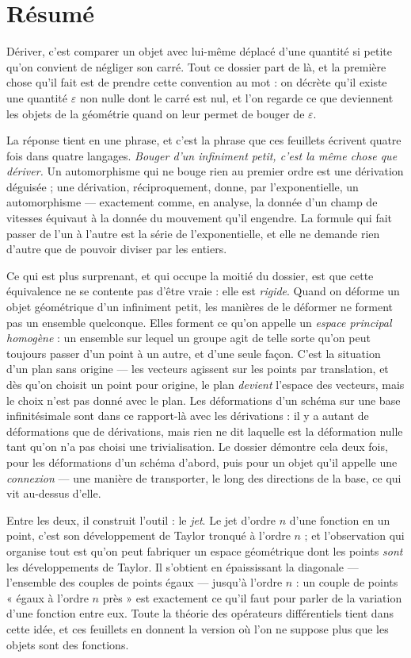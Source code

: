 \documentclass[11pt,a4paper]{article}
\begin{document}
\section*{Résumé}

\begin{resume}
Dériver, c'est comparer un objet avec lui-même déplacé d'une quantité si petite
qu'on convient de négliger son carré. Tout ce dossier part de là, et la première
chose qu'il fait est de prendre cette convention au mot : on décrète qu'il
existe une quantité $\varepsilon$ non nulle dont le carré est nul, et l'on
regarde ce que deviennent les objets de la géométrie quand on leur permet de
bouger de $\varepsilon$.

La réponse tient en une phrase, et c'est la phrase que ces feuillets écrivent
quatre fois dans quatre langages. \emph{Bouger d'un infiniment petit, c'est la
même chose que dériver.} Un automorphisme qui ne bouge rien au premier ordre
est une dérivation déguisée ; une dérivation, réciproquement, donne, par l'exponentielle, un automorphisme — exactement comme, en analyse, la donnée d'un champ de vitesses
équivaut à la donnée du mouvement qu'il engendre. La formule qui fait passer de
l'un à l'autre est la série de l'exponentielle, et elle ne demande rien d'autre
que de pouvoir diviser par les entiers.

Ce qui est plus surprenant, et qui occupe la moitié du dossier, est que cette
équivalence ne se contente pas d'être vraie : elle est \emph{rigide}. Quand on
déforme un objet géométrique d'un infiniment petit, les manières de le déformer
ne forment pas un ensemble quelconque. Elles forment ce qu'on appelle un
\emph{espace principal homogène} : un ensemble sur lequel un groupe agit de
telle sorte qu'on peut toujours passer d'un point à un autre, et d'une seule
façon. C'est la situation d'un plan sans origine — les vecteurs agissent sur les
points par translation, et dès qu'on choisit un point pour origine, le plan
\emph{devient} l'espace des vecteurs, mais le choix n'est pas donné avec le
plan. Les déformations d'un schéma sur une base infinitésimale sont dans ce
rapport-là avec les dérivations : il y a autant de déformations que de
dérivations, mais rien ne dit laquelle est la déformation nulle tant qu'on n'a
pas choisi une trivialisation. Le dossier démontre cela deux fois, pour les
déformations d'un schéma d'abord, puis pour un objet qu'il appelle une
\emph{connexion} — une manière de transporter, le long des directions de la
base, ce qui vit au-dessus d'elle.

Entre les deux, il construit l'outil : le \emph{jet}. Le jet d'ordre $n$ d'une
fonction en un point, c'est son développement de Taylor tronqué à l'ordre $n$ ;
et l'observation qui organise tout est qu'on peut fabriquer un espace
géométrique dont les points \emph{sont} les développements de Taylor. Il
s'obtient en épaississant la diagonale — l'ensemble des couples de points égaux
— jusqu'à l'ordre $n$ : un couple de points « égaux à l'ordre $n$ près » est
exactement ce qu'il faut pour parler de la variation d'une fonction entre eux.
Toute la théorie des opérateurs différentiels tient dans cette idée, et ces
feuillets en donnent la version où l'on ne suppose plus que les objets sont des
fonctions.


\end{resume}
\end{document}

